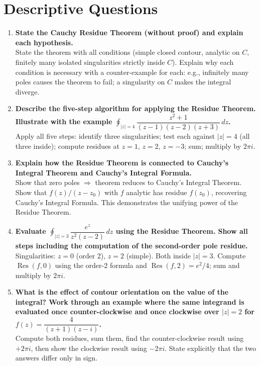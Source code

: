 \documentclass[12pt,a4paper]{article}
\begin{document}
\section{Descriptive Questions}

\begin{enumerate}[label=\textbf{D\arabic*.}, leftmargin=*]

\item \textbf{State the Cauchy Residue Theorem (without proof) and explain each
  hypothesis.}\\
  State the theorem with all conditions (simple closed contour, analytic on $C$,
  finitely many isolated singularities strictly inside $C$). Explain why each
  condition is necessary with a counter-example for each: e.g., infinitely many
  poles causes the theorem to fail; a singularity on $C$ makes the integral
  diverge.

\item \textbf{Describe the five-step algorithm for applying the Residue Theorem.
  Illustrate with the example
  $\oint_{|z|=4}\dfrac{z^2+1}{(z-1)(z-2)(z+3)}\,dz$.}\\
  Apply all five steps: identify three singularities; test each against $|z|=4$
  (all three inside); compute residues at $z=1$, $z=2$, $z=-3$; sum; multiply
  by $2\pi i$.

\item \textbf{Explain how the Residue Theorem is connected to Cauchy's Integral
  Theorem and Cauchy's Integral Formula.}\\
  Show that zero poles $\Rightarrow$ theorem reduces to Cauchy's Integral
  Theorem. Show that $f(z)/(z-z_0)$ with $f$ analytic has residue $f(z_0)$,
  recovering Cauchy's Integral Formula. This demonstrates the unifying power
  of the Residue Theorem.

\item \textbf{Evaluate $\oint_{|z|=3}\dfrac{e^z}{z^2(z-2)}\,dz$ using the
  Residue Theorem. Show all steps including the computation of the second-order
  pole residue.}\\
  Singularities: $z=0$ (order 2), $z=2$ (simple). Both inside $|z|=3$. Compute
  $\operatorname{Res}(f,0)$ using the order-2 formula and $\operatorname{Res}(f,2)
  = e^2/4$; sum and multiply by $2\pi i$.

\item \textbf{What is the effect of contour orientation on the value of the
  integral? Work through an example where the same integrand is evaluated once
  counter-clockwise and once clockwise over $|z|=2$ for
  $f(z)=\dfrac{4}{(z+1)(z-i)}$.}\\
  Compute both residues, sum them, find the counter-clockwise result using
  $+2\pi i$, then show the clockwise result using $-2\pi i$. State explicitly
  that the two answers differ only in sign.

\end{enumerate}
\end{document}
